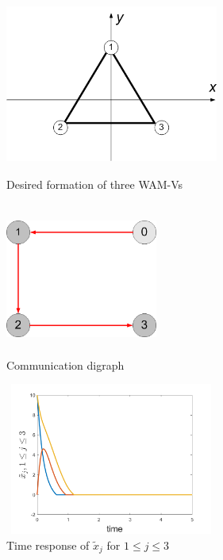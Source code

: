 \documentclass[letterpaper, 10 pt, conference]{ieeeconf}  %
\begin{document}
\begin{figure}
\begin{center}
\includegraphics[width=7cm,height=6cm]{pattern}
\caption{Desired formation of three WAM-Vs\label{pattern}}
\end{center}
\end{figure}


\begin{figure}
\begin{center}
\includegraphics[width=5cm,height=5cm]{comm2}
\caption{Communication digraph\label{commd}}
\end{center}
\end{figure}


\begin{figure}

\includegraphics[width=7cm,height=5cm]{xen}
\caption{Time response of $\tilde{x}_{j}$ for $1\leq j\leq
3$\label{xed}}
\end{figure}
\end{document}
